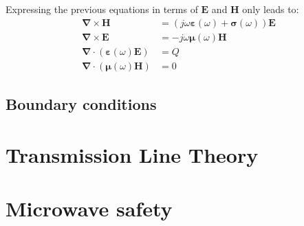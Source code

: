Expressing the previous equations in terms of $\mathbf{E}$ and $\mathbf{H}$ only leads to:
\begin{subequations}
 \begin{align}
  \boldsymbol{\nabla} \times \mathbf{H} &= \left(j\omega\boldsymbol{\varepsilon}(\omega) + \boldsymbol{\sigma}(\omega) \right) \mathbf{E}  \label{eq:Maxwell-Faraday-Harmonic} \\
  \boldsymbol{\nabla} \times \mathbf{E} &= -j\omega\boldsymbol{\mu}(\omega) \mathbf{H}  \label{eq:Maxwell-Ampere-Harmonic} \\
  \boldsymbol{\nabla} \cdot (\boldsymbol{\varepsilon}(\omega) \mathbf{E}) &= Q \label{eq:Maxwell-Gauss-Harmonic} \\
  \boldsymbol{\nabla} \cdot (\boldsymbol{\mu}(\omega) \mathbf{H} ) &= 0 \label{eq:Maxwell-Gauss-Magnetism-Harmonic} 
 \end{align}
\end{subequations}


\subsection{Boundary conditions}

\section{Transmission Line Theory}

\section{Microwave safety}
\parencite[sec.5.8.3]{Benford2015}


